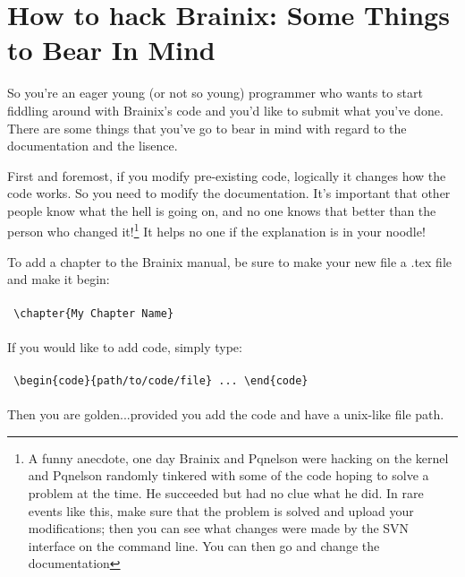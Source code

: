 \chapter{How to hack Brainix: Some Things to Bear In Mind}

So you're an eager young (or not so young) programmer who wants to start fiddling around with Brainix's code and you'd like to submit what you've done. There are some things that you've go to bear in mind with regard to the documentation and the lisence.

First and foremost, if you modify pre-existing code, logically it changes how the code works. So you need to modify the documentation. It's important that other people know what the hell is going on, and no one knows that better than the person who changed it!\footnote{A funny anecdote, one day Brainix and Pqnelson were hacking on the kernel and Pqnelson randomly tinkered with some of the code hoping to solve a problem at the time. He succeeded but had no clue what he did. In rare events like this, make sure that the problem is solved and upload your modifications; then you can see what changes were made by the SVN interface on the command line. You can then go and change the documentation} It helps no one if the explanation is in your noodle!

To add a chapter to the Brainix manual, be sure to make your new file a .tex file and make it begin:
\\
\\
\verb| \chapter{My Chapter Name} |
\\
\\
If you would like to add code, simply type:
\\
\\
\verb| \begin{code}{path/to/code/file} ... \end{code}|
\\
\\
Then you are golden...provided you add the code and have a unix-like file path.

